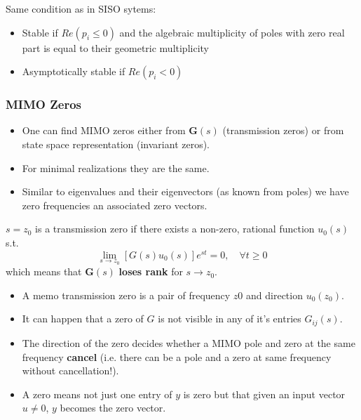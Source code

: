 
Same condition as in SISO sytems:
\begin{itemize}
    \item Stable if $Re(p_i \le 0)$ and the algebraic multiplicity of poles with zero real part is equal to their geometric multiplicity
    \item Asymptotically stable if $Re(p_i<0)$
\end{itemize}


\subsubsection{MIMO Zeros}
\begin{itemize}
    \item One can find MIMO zeros either from $\mathbf{G}(s)$ (transmission zeros) or from state space representation (invariant zeros).
    \item For minimal realizations they are the same.
    \item Similar to eigenvalues and their eigenvectors (as known from poles) we have zero frequencies an associated zero vectors.
\end{itemize}


$s = z_0$ is a transmission zero if there exists a non-zero, rational function $u_0(s)$ s.t.
\begin{equation*}
    \lim_{s\to z_0}\left[G(s)u_0(s)\right]e^{st}=0,\quad\forall t\geq0
\end{equation*}
which means that $\mathbf{G}(s)$ \textbf{loses rank} for $s\rightarrow z_0$.


\begin{itemize}
    \item A memo transmission zero is a pair of frequency $z0$ and direction $u_0(z_0)$.
    \item It can happen that a zero of $G$ is not visible in any of it's entries $G_{ij}(s)$.
    \item The direction of the zero decides whether a MIMO pole and zero at the same frequency \textbf{cancel} (i.e. there can be a pole and a zero at same frequency without cancellation!).
    \item A zero means not just one entry of $y$ is zero but that given an input vector $u \ne 0$, $y$ becomes the zero vector.
\end{itemize}

